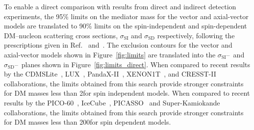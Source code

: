 To enable a direct comparison with results from direct and indirect detection experiments, the 95\% \CL limits on the mediator mass for the vector and axial-vector models are translated to 90\% \CL limits on the spin-independent and spin-dependent DM--nucleon scattering cross sections, $\sigma_{\text{SI}}$ and $\sigma_{\text{SD}}$ respectively, following the prescriptions given in Ref.~\cite{Boveia:2016mrp} and~\cite{dmforum}.
The exclusion contours for the vector and axial-vector models shown in Figure~\ref{fig:limits} are translated into the $\sigma_{\text{SI}}$--\mdm\ and $\sigma_{\text{SD}}$--\mdm\ planes shown in Figure~\ref{fig:limits_direct}. 
When compared to recent results by the CDMSLite~\cite{Agnese:2015nto}, LUX~\cite{Akerib:2016vxi}, PandaX-II~\cite{Cui:2017}, XENON1T~\cite{Aprile:2018}, and CRESST-II~\cite{Angloher:2015ewa} collaborations, the limits obtained from this search provide stronger constraints for DM masses less than 2\GeV for spin independent models.
When compared to recent results by the PICO-60~\cite{Amole:2017dex}, IceCube~\cite{Aartsen:2016exj}, PICASSO~\cite{Behnke:2016lsk} and Super-Kamiokande~\cite{Choi:2015ara} collaborations, the limits obtained from this search provide stronger constraints for DM masses less than 200\GeV for spin dependent models.
